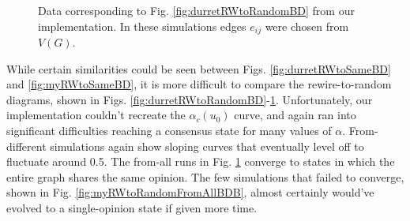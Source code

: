 \documentclass[11pt]{article}
\begin{document}
\begin{figure}
  \centering
  \hspace{3mm}
  \caption{Data corresponding to Fig. \ref{fig:durretRWtoRandomBD} from our implementation. In these simulations edges $e_{ij}$ were chosen from $V(G)$.}
  \label{fig:myRWtoRandomFromAllBD}
\end{figure}

While certain similarities could be seen between Figs. \ref{fig:durretRWtoSameBD} and \ref{fig:myRWtoSameBD}, it is more difficult to compare the rewire-to-random diagrams, shown in Figs. \ref{fig:durretRWtoRandomBD}-\ref{fig:myRWtoRandomFromAllBD}. Unfortunately, our implementation couldn't recreate the $\alpha_{c}(u_{0})$ curve, and again ran into significant difficulties reaching a consensus state for many values of $\alpha$. From-different simulations again show sloping curves that eventually level off to fluctuate around 0.5. The from-all runs in Fig. \ref{fig:myRWtoRandomFromAllBD} converge to states in which the entire graph shares the same opinion. The few simulations that failed to converge, shown in Fig. \ref{fig:myRWtoRandomFromAllBDB}, almost certainly would've evolved to a single-opinion state if given more time.
\end{document}
